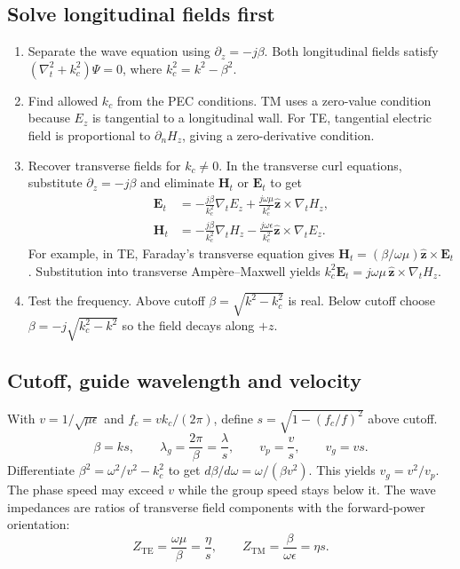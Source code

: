 \documentclass[12pt,a4paper]{article}
\begin{document}
\subsection{Solve longitudinal fields first}
\begin{enumerate}[leftmargin=*,itemsep=4pt]
\item Separate the wave equation using $\partial_z=-j\beta$. Both longitudinal fields satisfy $(\nabla_t^2+k_c^2)\Psi=0$, where $k_c^2=k^2-\beta^2$.
\item Find allowed $k_c$ from the PEC conditions. TM uses a zero-value condition because $E_z$ is tangential to a longitudinal wall. For TE, tangential electric field is proportional to $\partial_n H_z$, giving a zero-derivative condition.
\item Recover transverse fields for $k_c\ne0$. In the transverse curl equations, substitute $\partial_z=-j\beta$ and eliminate $\mathbf H_t$ or $\mathbf E_t$ to get
\[
\begin{aligned}
\mathbf E_t
 &=-\frac{j\beta}{k_c^2}\nabla_tE_z
   +\frac{j\omega\mu}{k_c^2}\hat{\mathbf z}\times\nabla_tH_z,\\
\mathbf H_t
 &=-\frac{j\beta}{k_c^2}\nabla_tH_z
   -\frac{j\omega\epsilon}{k_c^2}\hat{\mathbf z}\times\nabla_tE_z .
\end{aligned}
\]
For example, in TE, Faraday's transverse equation gives $\mathbf H_t=(\beta/\omega\mu)\hat{\mathbf z}\times\mathbf E_t$. Substitution into transverse Amp\`ere--Maxwell yields $k_c^2\mathbf E_t=j\omega\mu\,\hat{\mathbf z}\times\nabla_tH_z$.
\item Test the frequency. Above cutoff $\beta=\sqrt{k^2-k_c^2}$ is real. Below cutoff choose $\beta=-j\sqrt{k_c^2-k^2}$ so the field decays along $+z$.
\end{enumerate}
\subsection{Cutoff, guide wavelength and velocity}
With $v=1/\sqrt{\mu\epsilon}$ and $f_c=vk_c/(2\pi)$, define $s=\sqrt{1-(f_c/f)^2}$ above cutoff.
\[
\beta=ks,\qquad\lambda_g=\frac{2\pi}{\beta}=\frac{\lambda}{s},\qquad
v_p=\frac{v}{s},\qquad v_g=vs .
\]
Differentiate $\beta^2=\omega^2/v^2-k_c^2$ to get $d\beta/d\omega=\omega/(\beta v^2)$. This yields $v_g=v^2/v_p$. The phase speed may exceed $v$ while the group speed stays below it. The wave impedances are ratios of transverse field components with the forward-power orientation:
\[
Z_{\mathrm{TE}}=\frac{\omega\mu}{\beta}=\frac{\eta}{s},
\qquad Z_{\mathrm{TM}}=\frac{\beta}{\omega\epsilon}=\eta s.
\]
\end{document}

